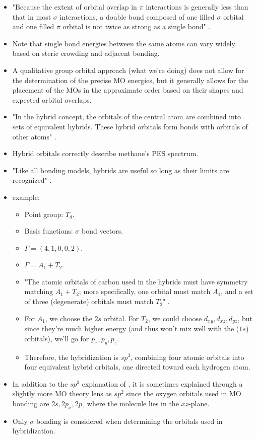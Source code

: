 \documentclass[../notes.tex]{subfiles}
\begin{document}
\begin{itemize}
\begin{itemize}
    \end{itemize}
    \item "Because the extent of orbital overlap in $\pi$ interactions is generally less than that in most $\sigma$ interactions, a double bond composed of one filled $\sigma$ orbital and one filled $\pi$ orbital is not twice as strong as a single bond" \parencite[161]{bib:MiesslerFischerTarr}.
    \item Note that single bond energies between the same atoms can vary widely based on steric crowding and adjacent bonding.
    \item A qualitative group orbital approach (what we're doing) does not allow for the determination of the precise MO energies, but it generally allows for the placement of the MOs in the approximate order based on their shapes and expected orbital overlaps.
    \item "In the hybrid concept, the orbitals of the central atom are combined into sets of equivalent hybrids. These hybrid orbitals form bonds with orbitals of other atoms" \parencite[161]{bib:MiesslerFischerTarr}.
    \item Hybrid orbitals correctly describe methane's PES spectrum.
    \item "Like all bonding models, hybrids are useful so long as their limits are recognized" \parencite[161]{bib:MiesslerFischerTarr}.
    \item {} example:
    \begin{itemize}
        \item Point group: $T_d$.
        \item Basis functions: $\sigma$ bond vectors.
        \item $\Gamma=(4,1,0,0,2)$.
        \item $\Gamma=A_1+T_2$.
        \item "The atomic orbitals of carbon used in the hybrids must have symmetry matching $A_1+T_2$; more specifically, one orbital must match $A_1$, and a set of three (degenerate) orbitals must match $T_2$" \parencite[162]{bib:MiesslerFischerTarr}.
        \item For $A_1$, we choose the $2s$ orbital. For $T_2$, we could choose $d_{xy},d_{xz},d_{yz}$, but since they're much higher energy (and thus won't mix well with the ($1s$) orbitals), we'll go for $p_x,p_y,p_z$.
        \item Therefore, the hybridization is $sp^3$, combining four atomic orbitals into four equivalent hybrid orbitals, one directed toward each hydrogen atom.
    \end{itemize}
    \item In addition to the $sp^3$ explanation of , it is sometimes explained through a slightly more MO theory lens as $sp^2$ since the oxygen orbitals used in MO bonding are $2s,2p_x,2p_z$ where the  molecule lies in the $xz$-plane.
    \item Only $\sigma$ bonding is considered when determining the orbitals used in hybridization.
\end{itemize}
\end{document}
